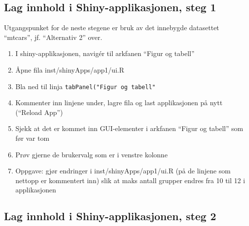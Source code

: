 \documentclass[]{article}
\providecommand{\tightlist}{%
  \setlength{\itemsep}{0pt}\setlength{\parskip}{0pt}}
\def\labelenumi{\arabic{enumi}.}
\begin{document}
\subsection{Lag innhold i Shiny-applikasjonen, steg
1}\label{lag-innhold-i-shiny-applikasjonen-steg-1}

Utgangspunket for de neste stegene er bruk av det innebygde datasettet
``mtcars'', jf. ``Alternativ 2'' over.

\begin{enumerate}
\def\labelenumi{\arabic{enumi}.}
\tightlist
\item
  I shiny-applikasjonen, navigér til arkfanen ``Figur og tabell''
\item
  Åpne fila inst/shinyApps/app1/ui.R
\item
  Bla ned til linja \texttt{tabPanel("Figur\ og\ tabell"}
\item
  Kommenter inn linjene under, lagre fila og last applikasjonen på nytt
  (``Reload App'')
\item
  Sjekk at det er kommet inn GUI-elementer i arkfanen ``Figur og
  tabell'' som før var tom
\item
  Prøv gjerne de brukervalg som er i venstre kolonne
\item
  Oppgave: gjør endringer i inst/shinyApps/app1/ui.R (på de linjene som
  nettopp er kommentert inn) slik at maks antall grupper endres fra 10
  til 12 i applikasjonen
\end{enumerate}

\subsection{Lag innhold i Shiny-applikasjonen, steg
2}\label{lag-innhold-i-shiny-applikasjonen-steg-2}
\end{document}
